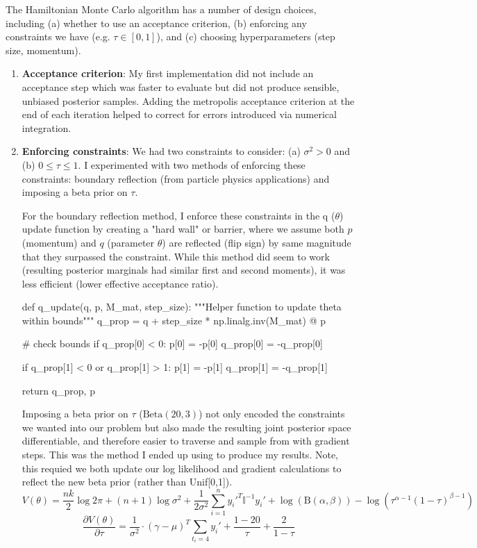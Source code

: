 \documentclass[12pt,letterpaper,twoside]{article}
\begin{document}
The Hamiltonian Monte Carlo algorithm has a number of design 
choices, including (a) whether to use an acceptance criterion, 
(b) enforcing any constraints we have (e.g. $\tau \in [0,1]$), 
and (c) choosing hyperparameters (step size, momentum).

\begin{enumerate}[label=(\alph*)]
\item \textbf{Acceptance criterion}: My first implementation did not 
include an acceptance step which was faster to evaluate but did 
not produce sensible, unbiased posterior samples. Adding the 
metropolis acceptance criterion at the end of each iteration 
helped to correct for errors introduced via numerical 
integration.

\item \textbf{Enforcing constraints}: We had two constraints to consider: 
(a) $\sigma^2 > 0$ and (b) $0 \le \tau \le 1$. I experimented with 
two methods of enforcing these constraints: boundary reflection (from 
particle physics applications) and imposing a beta prior on $\tau$.

For the boundary reflection method, I enforce these 
constraints in the q ($\theta$) update function by creating a 
"hard wall" or barrier, where we assume both $p$ (momentum) and 
$q$ (parameter $\theta$) are reflected (flip sign) by same magnitude 
that they surpassed the constraint. While this method did seem to work 
(resulting posterior marginals had similar first and second moments), it 
was less efficient (lower effective acceptance ratio).  

\begin{python}
def q_update(q, p, M_mat, step_size):
    """Helper function to update theta within bounds"""
    q_prop = q + step_size * np.linalg.inv(M_mat) @ p

    # check bounds
    if q_prop[0] < 0:
        p[0] = -p[0]
        q_prop[0] = -q_prop[0]

    if q_prop[1] < 0 or q_prop[1] > 1:
        p[1] = -p[1]
        q_prop[1] = -q_prop[1]

    return q_prop, p
\end{python}

Imposing a beta prior on $\tau$ ($\text{Beta}(20,3)$) not only encoded the 
constraints we wanted into our problem but also made the resulting joint 
posterior space differentiable, and therefore easier to traverse and sample 
from with gradient steps. This was the method I ended up using to produce my 
results. Note, this requied we both update our log likelihood and gradient 
calculations to reflect the new beta prior (rather than Unif[0,1]).
$$ V(\theta) = \frac{nk}{2} \log 2\pi + (n+1) \log \sigma^2 + \frac{1}{2\sigma^2} \sum_{i=1}^n y_i'^T \mathbb{I}^{-1} y_i' + \log({\text{B}(\alpha, \beta)}) - \log(\tau^{\alpha-1}(1-\tau)^{\beta-1}) $$
$$ \frac{\partial V(\theta)}{\partial \tau} = \frac{1}{\sigma^2} \cdot (\gamma - \mu)^T \sum_{t_i=4} y_i' + \frac{1-20}{\tau} + \frac{2}{1-\tau} $$ 


\end{enumerate}
\end{document}
